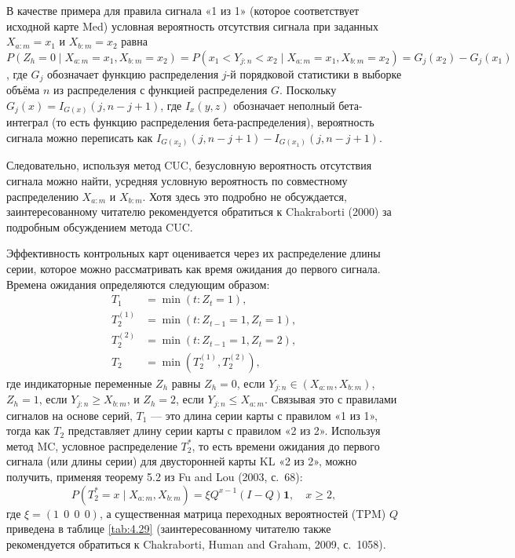 В качестве примера для правила сигнала «1 из 1» (которое соответствует исходной карте Med) условная вероятность отсутствия сигнала при заданных \(X_{a:m} = x_1\) и \(X_{b:m} = x_2\) равна \(P\left( Z_h = 0 \mid X_{a:m} = x_1, X_{b:m} = x_2 \right) = P\left( x_1 < Y_{j:n} < x_2 \mid X_{a:m} = x_1, X_{b:m} = x_2 \right) = G_j(x_2) - G_j(x_1)\), где \(G_j\) обозначает функцию распределения \(j\)-й порядковой статистики в выборке объёма \(n\) из распределения с функцией распределения \(G\). Поскольку \(G_j(x) = I_{G(x)}(j, n - j + 1)\), где \(I_x(y, z)\) обозначает неполный бета-интеграл (то есть функцию распределения бета-распределения), вероятность сигнала можно переписать как \(I_{G(x_2)}(j, n - j + 1) - I_{G(x_1)}(j, n - j + 1)\).

Следовательно, используя метод CUC, безусловную вероятность отсутствия сигнала можно найти, усредняя условную вероятность по совместному распределению \(X_{a:m}\) и \(X_{b:m}\). Хотя здесь это подробно не обсуждается, заинтересованному читателю рекомендуется обратиться к Chakraborti (2000) за подробным обсуждением метода CUC.

Эффективность контрольных карт оценивается через их распределение длины серии, которое можно рассматривать как время ожидания до первого сигнала. Времена ожидания определяются следующим образом:
\begin{align*}
	T_1 &= \min\left( t : Z_t = 1 \right), \\
	T_2^{(1)} &= \min\left( t : Z_{t-1} = 1, Z_t = 1 \right), \\
	T_2^{(2)} &= \min\left( t : Z_{t-1} = 1, Z_t = 2 \right), \\
	T_2 &= \min\left( T_2^{(1)}, T_2^{(2)} \right),
\end{align*}
где индикаторные переменные \(Z_h\) равны \(Z_h = 0\), если \(Y_{j:n} \in (X_{a:m}, X_{b:m})\), \(Z_h = 1\), если \(Y_{j:n} \ge X_{b:m}\), и \(Z_h = 2\), если \(Y_{j:n} \le X_{a:m}\).
Связывая это с правилами сигналов на основе серий, \(T_1\) --- это длина серии карты с правилом «1 из 1», тогда как \(T_2\) представляет длину серии карты с правилом «2 из 2». Используя метод MC, условное распределение \(T_2^*\), то есть времени ожидания до первого сигнала (или длины серии) для двусторонней карты KL «2 из 2», можно получить, применяя теорему 5.2 из Fu and Lou (2003, с.~68):
\[
	P\left( T_2^* = x \mid X_{a:m}, X_{b:m} \right) = \xi Q^{x-1}(I - Q)\mathbf{1}, \quad x \ge 2,
\]
где \(\xi = (1\ \ 0\ \ 0\ \ 0)\), а существенная матрица переходных вероятностей (TPM) \(Q\) приведена в таблице \ref{tab:4.29} (заинтересованному читателю также рекомендуется обратиться к Chakraborti, Human and Graham, 2009, с.~1058).

